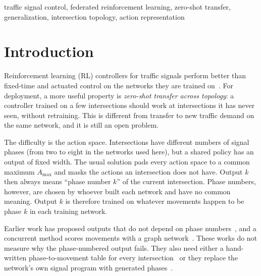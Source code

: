 \documentclass[conference]{IEEEtran}
\begin{document}
\begin{IEEEkeywords}
traffic signal control, federated reinforcement learning, zero-shot transfer,
generalization, intersection topology, action representation
\end{IEEEkeywords}

\section{Introduction}

Reinforcement learning (RL) controllers for traffic signals perform better than fixed-time
and actuated control on the networks they are trained on~\cite{intellilight,presslight,colight}.
For deployment, a more useful property is \emph{zero-shot transfer across topology}: a
controller trained on a few intersections should work at intersections it has never seen,
without retraining. This is different from transfer to new traffic demand on the same
network, and it is still an open problem.

The difficulty is the action space. Intersections have different numbers of signal phases
(from two to eight in the networks used here), but a shared policy has an output of fixed
width. The usual solution pads every action space to a common maximum $A_{\max}$ and masks
the actions an intersection does not have. Output $k$ then always means ``phase number
$k$'' of the current intersection. Phase numbers, however, are chosen by whoever built each
network and have no common meaning. Output $k$ is therefore trained on whatever movements
happen to be phase $k$ in each training network.

Earlier work has proposed outputs that do not depend on phase numbers~\cite{frap,mplight,attendlight},
and a concurrent method scores movements with a graph network~\cite{graphiface}. These works
do not measure why the phase-numbered output fails. They also need either a hand-written
phase-to-movement table for every intersection~\cite{frap,mplight} or they replace the
network's own signal program with generated phases~\cite{graphiface}.
\end{document}
